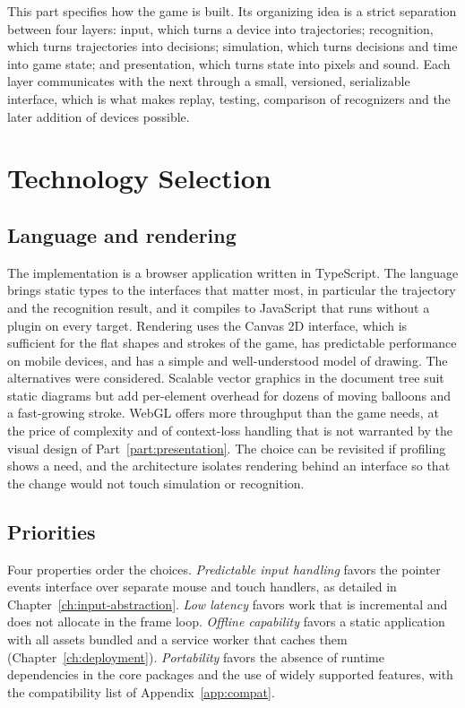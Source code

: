 This part specifies how the game is built. Its organizing idea is a strict separation between four layers: input, which turns a device into trajectories; recognition, which turns trajectories into decisions; simulation, which turns decisions and time into game state; and presentation, which turns state into pixels and sound. Each layer communicates with the next through a small, versioned, serializable interface, which is what makes replay, testing, comparison of recognizers and the later addition of devices possible.

\chapter{Technology Selection}\label{ch:technology}

\section{Language and rendering}

The implementation is a browser application written in TypeScript. The language brings static types to the interfaces that matter most, in particular the trajectory and the recognition result, and it compiles to JavaScript that runs without a plugin on every target. Rendering uses the Canvas 2D interface, which is sufficient for the flat shapes and strokes of the game, has predictable performance on mobile devices, and has a simple and well-understood model of drawing. The alternatives were considered. Scalable vector graphics in the document tree suit static diagrams but add per-element overhead for dozens of moving balloons and a fast-growing stroke. WebGL offers more throughput than the game needs, at the price of complexity and of context-loss handling that is not warranted by the visual design of Part~\ref{part:presentation}. The choice can be revisited if profiling shows a need, and the architecture isolates rendering behind an interface so that the change would not touch simulation or recognition.\evS

\section{Priorities}

Four properties order the choices. \emph{Predictable input handling} favors the pointer events interface over separate mouse and touch handlers, as detailed in Chapter~\ref{ch:input-abstraction}. \emph{Low latency} favors work that is incremental and does not allocate in the frame loop. \emph{Offline capability} favors a static application with all assets bundled and a service worker that caches them (Chapter~\ref{ch:deployment}). \emph{Portability} favors the absence of runtime dependencies in the core packages and the use of widely supported features, with the compatibility list of Appendix~\ref{app:compat}.

